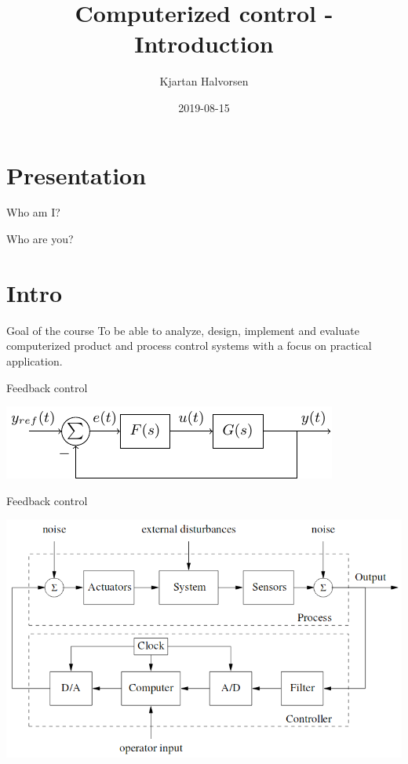 \documentclass[presentation,aspectratio=169]{beamer}
\author{Kjartan Halvorsen}
\date{2019-08-15}
\title{Computerized control - Introduction}
\begin{document}
\maketitle


\section{Presentation}
\label{sec-1}
\begin{frame}[label=sec-1-1]{Who am I?}
\end{frame}

\begin{frame}[label=sec-1-2]{Who are you?}
\end{frame}

\section{Intro}
\label{sec-2}
\begin{frame}[label=sec-2-1]{Goal of the course}
To be able to \alert{analyze}, \alert{design}, \alert{implement} and \alert{evaluate} computerized product and process control systems with a focus on practical application.
\end{frame}

\begin{frame}[label=sec-2-2]{Feedback control}
\begin{center}
\includegraphics[width=0.6\linewidth]{../../figures/block1}
\end{center}
\end{frame}
\begin{frame}[label=sec-2-3]{Feedback control}
\begin{center}
\includegraphics[width=0.7\linewidth]{../../figures/comp-contr-sys.png}
\end{center}
\end{frame}
\end{document}
